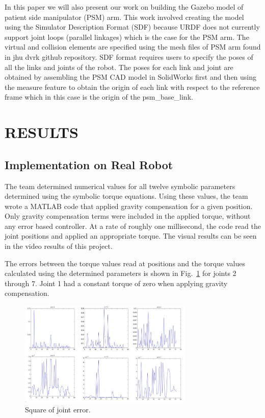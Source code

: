 \documentclass[conference]{IEEEtran}
\begin{document}
In this paper we will also present our work on building the Gazebo model of patient side manipulator (PSM) arm. This work involved creating the model using the Simulator Description Format (SDF) because URDF does not currently support joint loops (parallel linkages) which is the case for the PSM arm. The virtual and collision elements are specified using the mesh files of PSM arm found in jhu dvrk github repository. SDF format requires users to specify the poses of all the links and joints of the robot. The poses for each link and joint are obtained by assembling the PSM CAD model in SolidWorks first and then using the measure feature to obtain the origin of each link with respect to the reference frame which in this case is the origin of the psm{\_}base{\_}link.

\section{RESULTS}
\subsection{Implementation on Real Robot}
The team determined numerical values for all twelve symbolic parameters determined using the symbolic torque equations. Using these values, the team wrote a MATLAB code that applied gravity compensation for a given position. Only gravity compensation terms were included in the applied torque, without any error based controller. At a rate of roughly one millisecond, the code read the joint positions and applied an appropriate torque. The visual results can be seen in the video results of this project.

The errors between the torque values read at positions and the torque values calculated using the determined parameters is shown in Fig.~\ref{result11} for joints 2 through 7. Joint 1 had a constant torque of zero when applying gravity compensation.

\begin{figure}[!t]
\centering
\includegraphics[width=3.25in]{Joint_Errors}
\caption{Square of joint error.}
\label{result11}
\end{figure}
\end{document}
